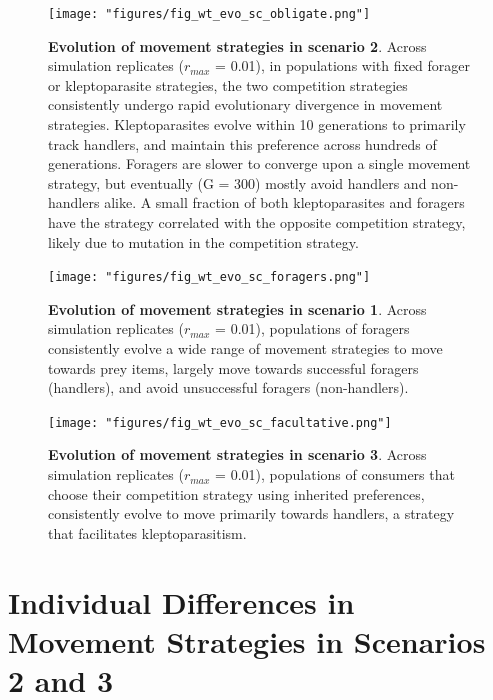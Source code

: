 \documentclass[]{article}
\begin{document}
\begin{figure}
\centering
\texttt{[image: "figures/fig\_wt\_evo\_sc\_obligate.png"]}
\caption{\textbf{Evolution of movement strategies in scenario 2}. Across simulation replicates (\(r_{max}\) = 0.01), in populations with fixed forager or kleptoparasite strategies, the two competition strategies consistently undergo rapid evolutionary divergence in movement strategies. Kleptoparasites evolve within 10 generations to primarily track handlers, and maintain this preference across hundreds of generations. Foragers are slower to converge upon a single movement strategy, but eventually (G = 300) mostly avoid handlers and non-handlers alike. A small fraction of both kleptoparasites and foragers have the strategy correlated with the opposite competition strategy, likely due to mutation in the competition strategy.}
\end{figure}

\begin{figure}
\centering
\texttt{[image: "figures/fig\_wt\_evo\_sc\_foragers.png"]}
\caption{\textbf{Evolution of movement strategies in scenario 1}. Across simulation replicates (\(r_{max}\) = 0.01), populations of foragers consistently evolve a wide range of movement strategies to move towards prey items, largely move towards successful foragers (handlers), and avoid unsuccessful foragers (non-handlers).}
\end{figure}

\begin{figure}
\centering
\texttt{[image: "figures/fig\_wt\_evo\_sc\_facultative.png"]}
\caption{\textbf{Evolution of movement strategies in scenario 3}. Across simulation replicates (\(r_{max}\) = 0.01), populations of consumers that choose their competition strategy using inherited preferences, consistently evolve to move primarily towards handlers, a strategy that facilitates kleptoparasitism.}
\end{figure}

\newpage

\hypertarget{individual-differences-in-movement-strategies-in-scenarios-2-and-3}{%
\section{Individual Differences in Movement Strategies in Scenarios 2 and 3}\label{individual-differences-in-movement-strategies-in-scenarios-2-and-3}}
\end{document}
